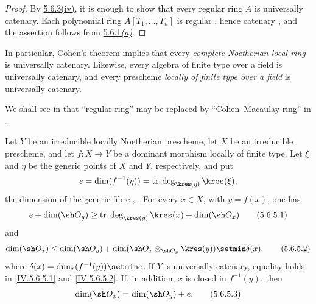 \begin{proof}
By {\hyperref[IV.5.6.3.iv]{5.6.3\textup{(iv)}}}, it is enough to show
that every regular ring
$A$ is universally catenary.  Each polynomial ring
$A[T_1,\ldots,T_n]$ is regular , hence catenary
, and the assertion follows from
{\hyperref[IV.5.6.1.a]{5.6.1\emph{(a)}}}.
\end{proof}

In particular, Cohen's theorem  implies that every
\emph{complete Noetherian local ring} is universally catenary.  Likewise,
every algebra of finite type over a field is universally catenary,
and every prescheme \emph{locally of finite type over a field} is
universally catenary.

We shall see in  that ``regular ring'' may be replaced
by ``Cohen--Macaulay ring'' in .

\begin{proposition}[5.6.5]
\label{IV.5.6.5}
Let $Y$ be an irreducible locally Noetherian prescheme, let $X$ be
an irreducible prescheme, and let $f:X\to Y$ be a dominant morphism
locally of finite type.  Let $\xi$ and $\eta$ be the generic points
of $X$ and $Y$, respectively, and put
\[
e=\dim(f^{-1}(\eta))
  =\operatorname{tr.deg}_{\kres(\eta)}\kres(\xi),
\]
the dimension of the generic fibre
, .
For every $x\in X$, with $y=f(x)$, one has
\begin{equation}
e+\dim(\sh O_y)
 \geq \operatorname{tr.deg}_{\kres(y)}\kres(x)
       +\dim(\sh O_x)
\tag{5.6.5.1}\label{IV.5.6.5.1}
\end{equation}
and
\begin{equation}
\dim(\sh O_x)
 \leq \dim(\sh O_y)
      +\dim(\sh O_x\otimes_{\sh O_y}\kres(y))
      \setmin\delta(x),
\tag{5.6.5.2}\label{IV.5.6.5.2}
\end{equation}
where $\delta(x)=\dim_x(f^{-1}(y))\setmin e$.
If $Y$ is universally catenary, equality holds in
\eqref{IV.5.6.5.1} and \eqref{IV.5.6.5.2}.  If, in addition, $x$ is
closed in $f^{-1}(y)$, then
\begin{equation}
\dim(\sh O_x)=\dim(\sh O_y)+e.
\tag{5.6.5.3}\label{IV.5.6.5.3}
\end{equation}
\end{proposition}

